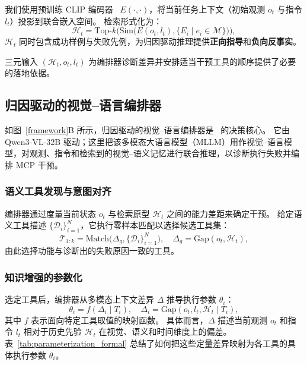 我们使用预训练 CLIP 编码器~\cite{CLIP} $E(\cdot, \cdot)$，将当前任务上下文（初始观测 $o_t$ 与指令 $l_t$）投影到联合嵌入空间。
检索形式化为：
\begin{equation}
\mathcal{H}_t = \text{Top-}k\Big(\text{Sim}\big(E(o_t, l_t), \{E_i \mid e_i \in \mathcal{M}\}\big)\Big),
\end{equation}
$\mathcal{H}_t$ 同时包含成功样例与失败先例，为归因驱动推理提供\textbf{正向指导}和\textbf{负向反事实}。

三元输入 $(\mathcal{H}_t, o_t, l_t)$ 为编排器诊断差异并安排适当干预工具的顺序提供了必要的落地依据。
\vspace{-0.5em}

\subsection{归因驱动的视觉--语言编排器}

如图~\ref{framework}B 所示，归因驱动的视觉--语言编排器是 \sys\ 的决策核心。
它由 Qwen3-VL-32B 驱动；这里把该多模态大语言模型（MLLM）用作视觉--语言模型，对观测、指令和检索到的视觉--语义记忆进行联合推理，以诊断执行失败并编排 MCP 干预。

\subsubsection{语义工具发现与意图对齐}

编排器通过度量当前状态 $o_t$ 与检索原型 $\mathcal{H}_t$ 之间的能力差距来确定干预。
给定语义工具描述 $\{\mathcal{D}_i\}_{i=1}^N$，它执行零样本匹配以选择候选工具集：
\begin{equation}
    \mathcal{T}_{1:k}= \text{Match}\big(\Delta_{g}, \{\mathcal{D}_i\}_{i=1}^N\big), \quad \Delta_{g} = \text{Gap}(o_t, \mathcal{H}_t),
\end{equation}
由此选择功能与诊断出的失败原因一致的工具。

\subsubsection{知识增强的参数化}
\label{Knowledge-Augmented Parameterization}

选定工具后，编排器从多模态上下文差异 $\Delta$ 推导执行参数 $\theta_i$：
\begin{equation}
 \theta_i = f(\Delta_i \mid T_i), \quad \Delta_i = \text{Gap}(o_t, l_t, \mathcal{H}_t\mid T_i),
\end{equation}
其中 $f$ 表示面向特定工具取值的映射函数。
具体而言，$\Delta$ 描述当前观测 $o_t$ 和指令 $l_t$ 相对于历史先验 $\mathcal{H}_t$ 在视觉、语义和时间维度上的偏差。
表~\ref{tab:parameterization_formal} 总结了如何把这些定量差异映射为各工具的具体执行参数 $\theta_i$。

